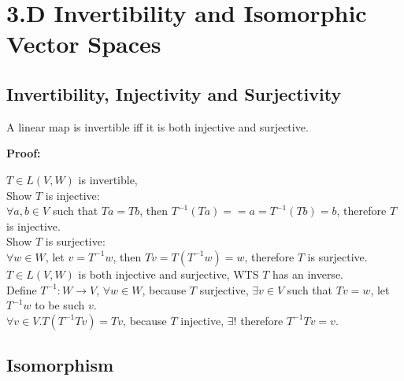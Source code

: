 \documentclass{article}
\begin{document}
\section{3.D Invertibility and Isomorphic Vector Spaces}
\subsection{Invertibility, Injectivity and Surjectivity}
\begin{addmargin}[1em]{0em}
A linear map is invertible iff it is both injective and surjective.
\end{addmargin}
\textbf{Proof:}
\begin{addmargin}[1em]{0em}
$T \in L(V, W)$ is invertible,\\
Show $T$ is injective:\\
$\forall a, b \in V$ such that $Ta = Tb$, then $T^{-1}(Ta) = =a = T^{-1}(Tb) = b$, therefore $T$ is injective.\\
Show $T$ is surjective:\\
$\forall w \in W$, let $v = T^{-1}w$, then $Tv = T(T^{-1}w) = w$, therefore $T$ is surjective.\\
$T \in L(V, W)$ is both injective and surjective, WTS $T$ has an inverse.\\
Define $T^{-1}:W \rightarrow V$, $\forall w \in W$, because $T$ surjective, $\exists v \in V$ such that $Tv = w$, let $T^{-1}w$ to be such $v$.\\
$\forall v \in V. T(T^{-1}Tv) = Tv$, because $T$ injective, $\exists!$ therefore $T^{-1}Tv = v$.
\end{addmargin}
\subsection{Isomorphism}
\end{document}
